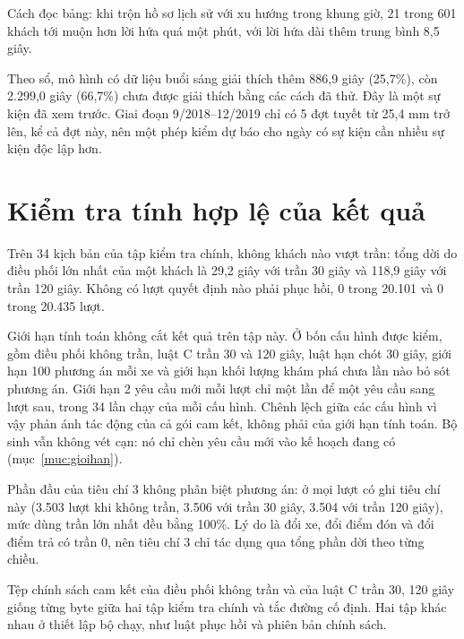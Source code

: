 Cách đọc bảng: khi trộn hồ sơ lịch sử với xu hướng trong khung giờ, 21 trong 601 khách tới muộn hơn lời hứa quá một
phút, với lời hứa dài thêm trung bình 8,5 giây.

Theo sổ, mô hình có dữ liệu buổi sáng giải thích thêm 886,9 giây (25,7\%), còn 2.299,0 giây (66,7\%) chưa được giải
thích bằng các cách đã thử. Đây là một sự kiện đã xem trước. Giai đoạn 9/2018--12/2019 chỉ có 5 đợt tuyết từ 25,4 mm
trở lên, kể cả đợt này, nên một phép kiểm dự báo cho ngày có sự kiện cần nhiều sự kiện độc lập hơn.

\section{Kiểm tra tính hợp lệ của kết quả}
\label{muc:c4-hople}

Trên 34 kịch bản của tập kiểm tra chính, không khách nào vượt trần: tổng dời do điều phối lớn nhất của một khách là
29,2 giây với trần 30 giây và 118,9 giây với trần 120 giây. Không có lượt quyết định nào phải phục hồi, 0 trong 20.101
và 0 trong 20.435 lượt.

Giới hạn tính toán không cắt kết quả trên tập này. Ở bốn cấu hình được kiểm, gồm điều phối không trần, luật C trần 30
và 120 giây, luật hạn chót 30 giây, giới hạn 100 phương án mỗi xe và giới hạn khối lượng khám phá chưa lần nào bỏ sót
phương án. Giới hạn 2 yêu cầu mới mỗi lượt chỉ một lần để một yêu cầu sang lượt sau, trong 34 lần chạy của mỗi cấu
hình. Chênh lệch giữa các cấu hình vì vậy phản ánh tác động của cả gói cam kết, không phải của giới hạn tính toán. Bộ
sinh vẫn không vét cạn: nó chỉ chèn yêu cầu mới vào kế hoạch đang có (mục~\ref{muc:gioihan}).

Phần đầu của tiêu chí 3 không phân biệt phương án: ở mọi lượt có ghi tiêu chí này (3.503 lượt khi không trần, 3.506
với trần 30 giây, 3.504 với trần 120 giây), mức dùng trần lớn nhất đều bằng 100\%. Lý do là đổi xe, đổi điểm đón và
đổi điểm trả có trần 0, nên tiêu chí 3 chỉ tác dụng qua tổng phần dời theo từng chiều.

Tệp chính sách cam kết của điều phối không trần và của luật C trần 30, 120 giây giống từng byte giữa hai tập kiểm tra
chính và tắc đường cố định. Hai tập khác nhau ở thiết lập bộ chạy, như luật phục hồi và phiên bản chính sách.

